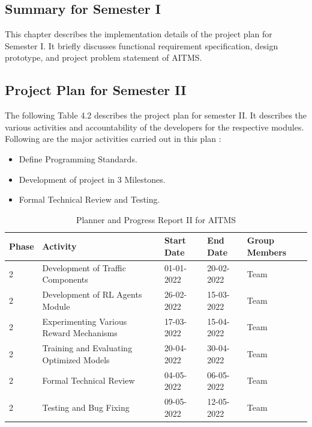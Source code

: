 \documentclass[openany,12pt]{report}
\begin{document}
	\subsection{Summary for Semester I}
	\hspace*{0.5 in}This chapter describes the implementation details of the project plan for
Semester I. It briefly discusses functional requirement specification, design prototype, and project 
problem statement of AITMS.


	\subsection{Project Plan for Semester II}
	
		\hspace*{0.5 in}The following Table 4.2 describes the project plan for semester II. It describes the various activities and accountability of the developers for the respective modules. Following are the major activities carried out in this plan :
		\begin{itemize}
			\item{Define Programming Standards.}
			\item{Development of project in 3 Milestones.}
			\item{Formal Technical Review and Testing.}
		\end{itemize}
	
		\begin{table} [htb]
			\begin{tabular}{| p{1.2 cm}| p{5 cm}| p{2.5 cm}| p{2.5 cm}| p{3 cm}| }\hline
				\textbf{Phase}	&\textbf{Activity}	&\textbf{Start Date}	&\textbf{End Date} &\textbf{Group Members}\\\hline\hline

				2 
				&Development of Traffic Components
				&01-01-2022 	
				&20-02-2022 &Team \\\hline

				2 
				&Development of RL Agents Module
				&26-02-2022 
				&15-03-2022 &Team\\\hline

				2 
				&Experimenting Various Reward Mechanisms
				&17-03-2022 
				&15-04-2022 &Team\\\hline

				2 
				&Training and Evaluating Optimized Models
				&20-04-2022 
				&30-04-2022 & Team \\\hline

				2 
				&Formal Technical Review 
				&04-05-2022 
				&06-05-2022 &Team \\\hline

				2 
				&Testing and Bug Fixing  
				&09-05-2022 
				&12-05-2022 &Team\\\hline
				
			\end{tabular}
			\caption{Planner and Progress Report II for AITMS}
			\label{tab:nnwork}
		\end{table}
	
\end{document}
